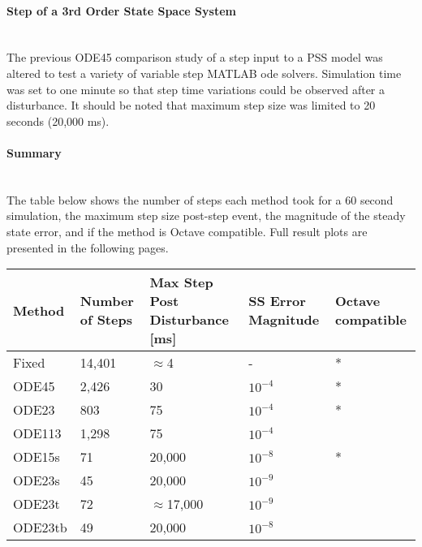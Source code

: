 \documentclass[12pt]{article}
\begin{document}
\onehalfspacing
\paragraph{Step of a 3rd Order State Space System} \ \\
The previous ODE45 comparison study of a step input to a PSS model was altered to test a variety of variable step MATLAB ode solvers.
Simulation time was set to one minute so that step time variations could be observed after a disturbance.
It should be noted that maximum step size was limited to 20 seconds (20,000 ms).

\paragraph{Summary} \ \\
The table below shows the number of steps each method took for a 60 second simulation, the maximum step size post-step event, the magnitude of the steady state error, and if the method is Octave compatible.
Full result plots are presented in the following pages.

\begin{table}[!ht]
	\centering
	\begin{tabular}{@{} L{2cm} 
	R{2cm} R{4cm}  R{3cm} C{3cm}@{}} 	
		\toprule %
		\footnotesize %
		\raggedright %
Method & 	Number of Steps & 	 Max Step Post Disturbance [ms]	& SS Error Magnitude & Octave compatible\\ \midrule
Fixed & 14,401 & $\approx$4 & - & *\\
ODE45 & 2,426 & 30 & $10^{-4}$ & *\\
ODE23 & 803 & 75 & $10^{-4}$ & * \\
ODE113 & 1,298 & 75 & $10^{-4}$\\
ODE15s & 71 & 20,000 & $10^{-8}$ & *\\
ODE23s & 45 & 20,000 & $10^{-9}$\\
ODE23t & 72 & $\approx$17,000 & $10^{-9}$\\
ODE23tb & 49 & 20,000 & $10^{-8}$\\

		\bottomrule
	\end{tabular}
\end{table}
\end{document}
